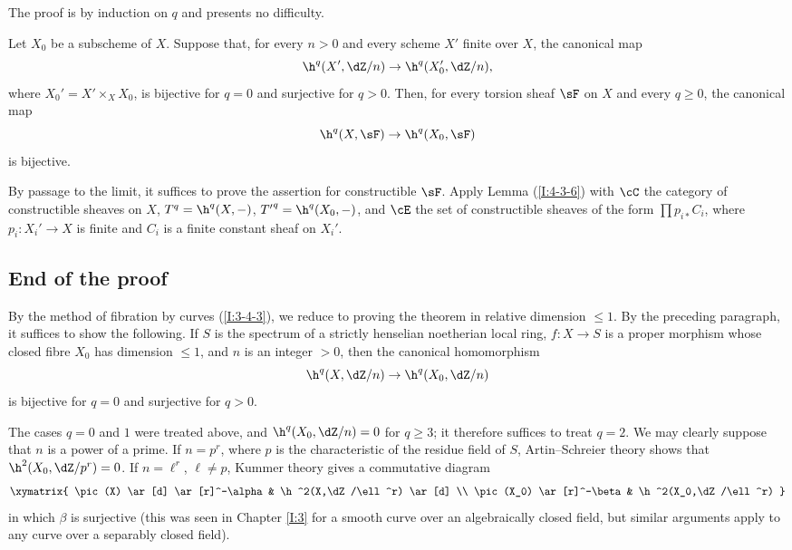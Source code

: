 \documentclass[oneside]{book}
\begin{document}
The proof is by induction on $q$ and presents no difficulty.

\begin{proposition}\label{I:4-3-7}
Let $X_0$ be a subscheme of $X$. Suppose that, for every
$n>0$ and every scheme $X'$ finite over $X$, the canonical map
\[
  \h^q(X',\dZ/n) \to \h^q(X_0',\dZ/n)\text{,}
\]
where $X_0'=X'\times_XX_0$, is bijective for $q=0$ and surjective for
$q>0$. Then, for every torsion sheaf $\sF$ on $X$ and every
$q\geqslant0$, the canonical map
\[
  \h^q(X,\sF) \to \h^q(X_0,\sF)
\]
is bijective.
\end{proposition}

By passage to the limit, it suffices to prove the assertion for
constructible $\sF$. Apply Lemma (\ref{I:4-3-6}) with $\cC$ the category
of constructible sheaves on $X$, $T^q=\h^q(X,-)$,
${T'}^q=\h^q(X_0,-)$, and $\cE$ the set of constructible sheaves of the
form $\prod p_{i*}C_i$, where $p_i:X_i'\to X$ is finite and $C_i$ is a
finite constant sheaf on $X_i'$.

\subsection{End of the proof}\label{I:4-4}

By the method of fibration by curves (\ref{I:3-4-3}), we reduce to proving
the theorem in relative dimension $\leqslant1$. By the preceding
paragraph, it suffices to show the following. If $S$ is the spectrum of a
strictly henselian noetherian local ring, $f:X\to S$ is a proper
morphism whose closed fibre $X_0$ has dimension $\leqslant1$, and $n$
is an integer $>0$, then the canonical homomorphism
\[
  \h^q(X,\dZ/n) \to \h^q(X_0,\dZ/n)
\]
is bijective for $q=0$ and surjective for $q>0$.

The cases $q=0$ and $1$ were treated above, and
$\h^q(X_0,\dZ/n)=0$ for $q\geqslant3$; it therefore suffices to treat
$q=2$. We may clearly suppose that $n$ is a power of a prime. If
$n=p^r$, where $p$ is the characteristic of the residue field of $S$,
Artin--Schreier theory shows that $\h^2(X_0,\dZ/p^r)=0$. If
$n=\ell^r$, $\ell\ne p$, Kummer theory gives a commutative diagram
\[\xymatrix{
  \pic(X) \ar[d] \ar[r]^-\alpha
    & \h^2(X,\dZ/\ell^r) \ar[d] \\
  \pic(X_0) \ar[r]^-\beta
    & \h^2(X_0,\dZ/\ell^r)
}\]
in which $\beta$ is surjective (this was seen in Chapter \ref{I:3} for a
smooth curve over an algebraically closed field, but similar arguments
apply to any curve over a separably closed field).
\end{document}
